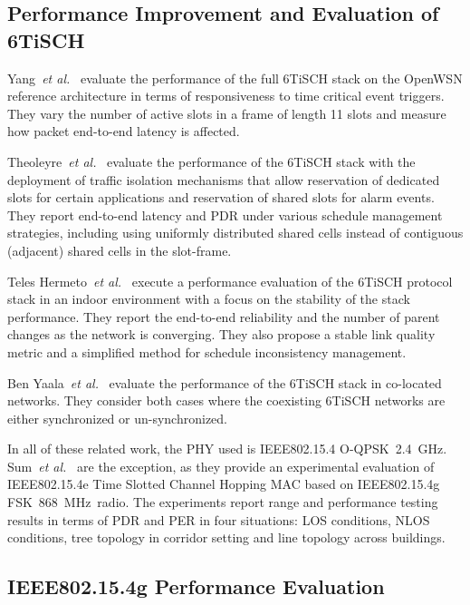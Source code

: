 \documentclass[sensors,article,submit,moreauthors,pdftex]{Definitions/mdpi}
\newcommand{\fsk}           {FSK~868~MHz}
\newcommand{\oqpsk}         {O-QPSK~2.4~GHz}
\newcommand{\etal}          {\textit{et al.}}
\begin{document}
\subsection{Performance Improvement and Evaluation of 6TiSCH}
\label{sec:related_6tisch}

Yang~\etal~\cite{yang18analysis} evaluate the performance of the full 6TiSCH stack on the OpenWSN reference architecture in terms of responsiveness to time critical event triggers.
They vary the number of active slots in a frame of length 11 slots and measure how packet end-to-end latency is affected.

Theoleyre~\etal~\cite{theoleyre16experimental} evaluate the performance of the 6TiSCH stack with the deployment of traffic isolation mechanisms that allow reservation of dedicated slots for certain applications and reservation of shared slots for alarm events.
They report end-to-end latency and PDR under various schedule management strategies,
    including using uniformly distributed shared cells instead of contiguous (adjacent) shared cells in the slot-frame.

Teles Hermeto~\etal~\cite{teleshermeto18reactions} execute a performance evaluation of the 6TiSCH protocol stack in an indoor environment with a focus on the stability of the stack performance.
They report the end-to-end reliability and the number of parent changes as the network is converging.
They also propose a stable link quality metric and a simplified method for schedule inconsistency management. 

Ben Yaala~\etal~\cite{benyaala16performance} evaluate the performance of the 6TiSCH stack in co-located networks.
They consider both cases where the coexisting 6TiSCH networks are either synchronized or un-synchronized.

In all of these related work, the PHY used is IEEE802.15.4 \oqpsk.
Sum~\etal~\cite{sum17experimental} are the exception, as they provide an experimental evaluation of IEEE802.15.4e Time Slotted Channel Hopping MAC based on IEEE802.15.4g \fsk\ radio.
The experiments report range and performance testing results in terms of PDR and PER in four situations:
    LOS conditions,
    NLOS conditions,
    tree topology in corridor setting and
    line topology across buildings.

\subsection{IEEE802.15.4g Performance Evaluation}
\label{sec:related_4g}
\end{document}
